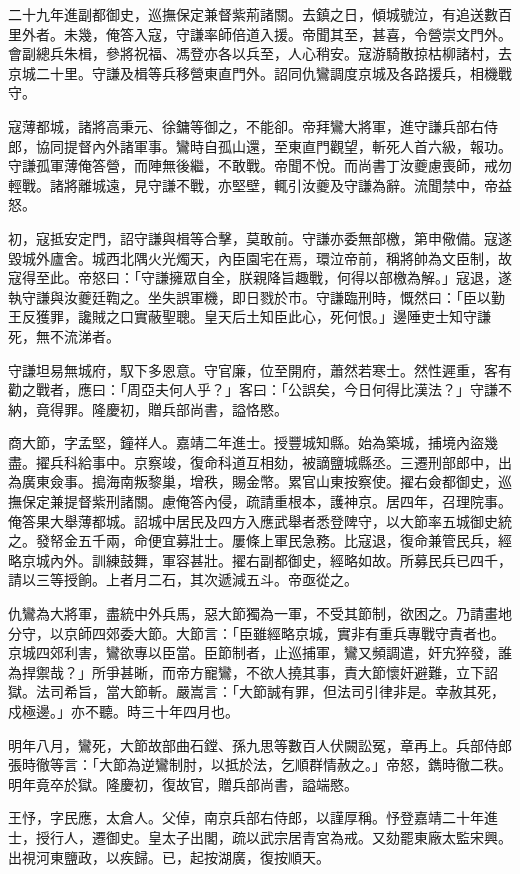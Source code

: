 \begin{pinyinscope}
二十九年進副都御史，巡撫保定兼督紫荊諸關。去鎮之日，傾城號泣，有追送數百里外者。未幾，俺答入寇，守謙率師倍道入援。帝聞其至，甚喜，令營崇文門外。會副總兵朱楫，參將祝福、馮登亦各以兵至，人心稍安。寇游騎散掠枯柳諸村，去京城二十里。守謙及楫等兵移營東直門外。詔同仇鸞調度京城及各路援兵，相機戰守。

寇薄都城，諸將高秉元、徐鏞等御之，不能卻。帝拜鸞大將軍，進守謙兵部右侍郎，協同提督內外諸軍事。鸞時自孤山還，至東直門觀望，斬死人首六級，報功。守謙孤軍薄俺答營，而陣無後繼，不敢戰。帝聞不悅。而尚書丁汝夔慮喪師，戒勿輕戰。諸將離城遠，見守謙不戰，亦堅壁，輒引汝夔及守謙為辭。流聞禁中，帝益怒。

初，寇抵安定門，詔守謙與楫等合擊，莫敢前。守謙亦委無部檄，第申儆備。寇遂毀城外廬舍。城西北隅火光燭天，內臣園宅在焉，環泣帝前，稱將帥為文臣制，故寇得至此。帝怒曰：「守謙擁眾自全，朕親降旨趣戰，何得以部檄為解。」寇退，遂執守謙與汝夔廷鞫之。坐失誤軍機，即日戮於市。守謙臨刑時，慨然曰：「臣以勤王反獲罪，讒賊之口實蔽聖聰。皇天后土知臣此心，死何恨。」邊陲吏士知守謙死，無不流涕者。

守謙坦易無城府，馭下多恩意。守官廉，位至開府，蕭然若寒士。然性遲重，客有勸之戰者，應曰：「周亞夫何人乎？」客曰：「公誤矣，今日何得比漢法？」守謙不納，竟得罪。隆慶初，贈兵部尚書，謚恪愍。

商大節，字孟堅，鐘祥人。嘉靖二年進士。授豐城知縣。始為築城，捕境內盜幾盡。擢兵科給事中。京察竣，復命科道互相劾，被謫鹽城縣丞。三遷刑部郎中，出為廣東僉事。搗海南叛黎巢，增秩，賜金幣。累官山東按察使。擢右僉都御史，巡撫保定兼提督紫刑諸關。慮俺答內侵，疏請重根本，護神京。居四年，召理院事。俺答果大舉薄都城。詔城中居民及四方入應武舉者悉登陴守，以大節率五城御史統之。發帑金五千兩，命便宜募壯士。屢條上軍民急務。比寇退，復命兼管民兵，經略京城內外。訓練鼓舞，軍容甚壯。擢右副都御史，經略如故。所募民兵已四千，請以三等授餉。上者月二石，其次遞減五斗。帝亟從之。

仇鸞為大將軍，盡統中外兵馬，惡大節獨為一軍，不受其節制，欲困之。乃請畫地分守，以京師四郊委大節。大節言：「臣雖經略京城，實非有重兵專戰守責者也。京城四郊利害，鸞欲專以臣當。臣節制者，止巡捕軍，鸞又頻調遣，奸宄猝發，誰為捍禦哉？」所爭甚晰，而帝方寵鸞，不欲人撓其事，責大節懷奸避難，立下詔獄。法司希旨，當大節斬。嚴嵩言：「大節誠有罪，但法司引律非是。幸赦其死，戍極邊。」亦不聽。時三十年四月也。

明年八月，鸞死，大節故部曲石鏜、孫九思等數百人伏闕訟冤，章再上。兵部侍郎張時徹等言：「大節為逆鸞制肘，以抵於法，乞順群情赦之。」帝怒，鐫時徹二秩。明年竟卒於獄。隆慶初，復故官，贈兵部尚書，謚端愍。

王忬，字民應，太倉人。父倬，南京兵部右侍郎，以謹厚稱。忬登嘉靖二十年進士，授行人，遷御史。皇太子出閣，疏以武宗居青宮為戒。又劾罷東廠太監宋興。出視河東鹽政，以疾歸。已，起按湖廣，復按順天。


\end{pinyinscope}
